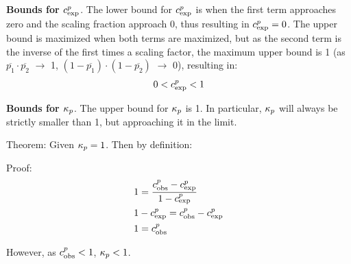 \textbf{Bounds for $c_{\text{exp}}^{p}$}. The lower bound for $c_{\text{exp}}^{p}$ is when the first term approaches zero and the scaling fraction approach 0, thus resulting in $c_{\text{exp}}^{p}=0$. The upper bound is maximized when both terms are maximized, but as the second term is the inverse of the first times a scaling factor, the maximum upper bound is 1 (as $\overline{p_1} \cdot \overline{p_2}$ $\rightarrow$ 1, $(1 - \overline{p_1}) \cdot (1 - \overline{p_2})$ $\rightarrow$ 0), resulting in: 
\begin{align}
    0 < c_{\text{exp}}^{p} < 1 
\end{align}

\textbf{Bounds for $\kappa_{p}$}.
The upper bound for $\kappa_{p}$ is 1. In particular, $\kappa_{p}$ will always be strictly smaller than 1, but approaching it in the limit. 

Theorem:
Given $\kappa_{p}=1$. Then by definition:

Proof:
\begin{align*}
      & 1 = \frac{c_{\text{obs}}^{p} - c_{\text{exp}}^{p}}{1-c_{\text{exp}}^{p}} \\ 
     & 1 - c_{\text{exp}}^{p} = c_{\text{obs}}^{p} - c_{\text{exp}}^{p} \\
     & 1 = c_{\text{obs}}^{p}
\end{align*}

However, as $c_{\text{obs}}^{p} < 1$, $\kappa_{p} < 1$. 

